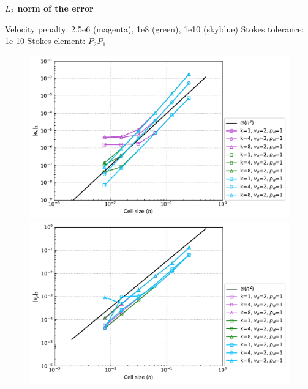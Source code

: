 \documentclass[12pt]{article}
\numberwithin{equation}{subsection}
\begin{document}
\newpage
\textbf{$L_{2}$ norm of the error}

\begin{adjustwidth}{1cm}{5cm}
	Velocity penalty: 2.5e6 (magenta), 1e8 (green), 1e10 (skyblue) \newline
	Stokes tolerance: 1e-10 \newline
	Stokes element: $P_{2}P_{1}$
\end{adjustwidth}


\begin{figure}[!htb]
		\begin{multicols}{1}
				\hspace{3.0in} \includegraphics[width=17cm]{../Annulus_Benchmark_Thieulot/benchmark_figs/vel_err_conv_vel_penalty_1.0e+10_stokes_tol_1.0e-10_all_v_pen.pdf}
		\end{multicols}
		
		\begin{multicols}{1}
			\hspace{3.0in} \includegraphics[width=17cm]{../Annulus_Benchmark_Thieulot/benchmark_figs/p_err_conv_vel_penalty_1.0e+10_stokes_tol_1.0e-10_all_v_pen.pdf}
		\end{multicols}
\end{figure}
\end{document}
